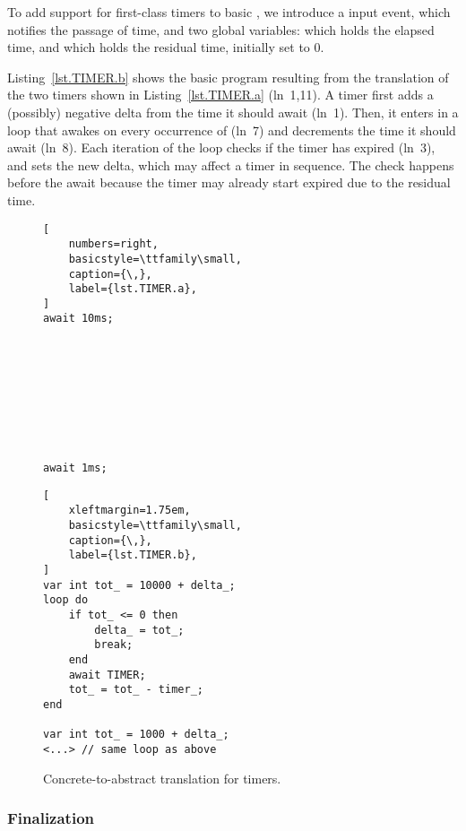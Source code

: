 To add support for first-class timers to basic \CEU , we introduce a
 input event, which notifies the passage of time, and two global
variables:  which holds the elapsed time, and 
which holds the residual time, initially set to 0.

Listing~\ref{lst.TIMER.b} shows the basic \CEU program resulting from the
translation of the two timers shown in Listing~\ref{lst.TIMER.a} (ln~1,11).
A timer first adds a (possibly) negative delta from the time it should await
(ln~1).  Then, it enters in a loop that awakes on every occurrence of
 (ln~7) and decrements the time it should await (ln~8).  Each
iteration of the loop checks if the timer has expired (ln~3), and sets the
new delta, which may affect a timer in sequence.  The check happens before
the await because the timer may already start expired due to the residual
time.

\begin{figure}[!ht]
\begin{minipage}[t]{0.33\linewidth}
\begin{lstlisting}[
    numbers=right,
    basicstyle=\ttfamily\small,
    caption={\,},
    label={lst.TIMER.a},
]
await 10ms;









await 1ms;

\end{lstlisting}
\end{minipage}
%
\begin{minipage}[t]{0.63\linewidth}
\begin{lstlisting}[
    xleftmargin=1.75em,
    basicstyle=\ttfamily\small,
    caption={\,},
    label={lst.TIMER.b},
]
var int tot_ = 10000 + delta_;
loop do
    if tot_ <= 0 then
        delta_ = tot_;
        break;
    end
    await TIMER;
    tot_ = tot_ - timer_;
end

var int tot_ = 1000 + delta_;
<...> // same loop as above
\end{lstlisting}
\end{minipage}
\caption{ Concrete-to-abstract translation for timers. }
\label{lst.TIMER}
\end{figure}

\subsubsection{Finalization}

